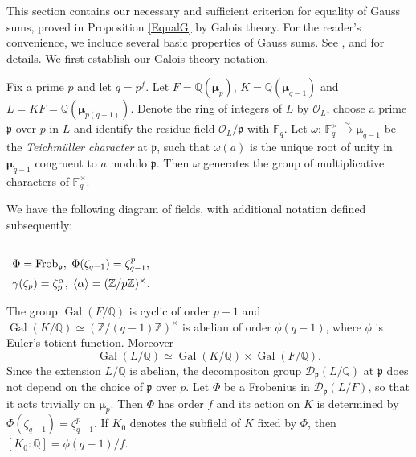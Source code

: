 \documentclass[12pt]{amsart}  \usepackage{amsmath,amssymb,enumerate,amscd,tikz,url}
\numberwithin{equation}{section}
\theoremstyle{definition}
\newcommand{\F}{{\mathbb F}}
\newcommand{\Q}{{\mathbb Q}}
\newcommand{\Z}{{\mathbb Z}}
\newcommand{\Mu}{\boldsymbol \mu}
\newcommand{\gp}{{\mathfrak p}}
\newcommand{\cD}{{\mathcal D}}
\newcommand{\cO}{{\mathcal O}}
\newcommand{\Gal}{\operatorname{Gal}}
\newcommand{\Frob}{{\rm Frob}}
\newcommand{\lr}[1]{{\langle {#1} \rangle}}
\newcommand{\fdeg}[2]{[{#1}\!:\!{#2}]}
\begin{document}
This section contains our necessary and sufficient criterion for equality of Gauss sums, proved in Proposition \ref{EqualG} by Galois theory.  For the reader's convenience, we include several basic properties of Gauss sums.   See \cite[\S6.1--6.2, 87--100]{W}, \cite[IV, \S3, 90--97]{L} and \cite[Ch.]{BEW} for details.  We first establish our Galois theory notation.

Fix a prime $p$ and let $q = p^f$.  Let $F = \Q(\Mu_p)$, $K = \Q(\Mu_{q-1})$ and $L = KF = \Q(\Mu_{p(q-1)})$.  Denote the ring of integers of $L$ by  $\cO_L$, choose a prime $\gp$ over $p$ in $L$ and identify the residue field $\cO_L/\gp$ with $\F_q$.  Let $\omega\!: \, \F_q^\times \xrightarrow{\sim} \Mu_{q-1}$ be the {\em Teichm\"uller character} at $\gp$, such that $\omega(a)$ is the unique root of unity in $\Mu_{q-1}$ congruent to $a$ modulo $\gp$.  Then $\omega$ generates the group of multiplicative characters of $\F_q^\times$.  

We have the following diagram of fields, with additional notation defined subsequently:  

\vspace{2  pt}

\begin{center}
$\begin{array}{l} 
\\
\Phi = \Frob_\gp, \hspace{3 pt} \Phi(\zeta_{q-1}) = \zeta_{q-1}^p,  \vspace{5 pt} \\ \gamma(\zeta_p) = \zeta_p^\alpha,   \hspace{3 pt} \lr{\alpha} = (\Z/p\Z)^\times.  \end{array}$
\end{center}
The group $\Gal(F/\Q)$ is cyclic of order $p-1$ and $\Gal(K/\Q) \simeq (\Z/(q-1)\Z)^\times$ is abelian of order $\phi(q-1)$, where $\phi$ is Euler's totient-function.   Moreover 
$$
\Gal(L/\Q) \simeq \Gal(K/\Q) \times \Gal(F/\Q).
$$  
Since the extension $L/\Q$ is abelian, the decompositon group $\cD_\gp(L/\Q)$ at $\gp$ does not depend on the choice of $\gp$ over $p$.  Let $\Phi$ be a Frobenius in $\cD_\gp(L/F)$, so that it acts trivially on $\Mu_p$.  Then $\Phi$ has order $f$ and its action on $K$ is determined by $\Phi(\zeta_{q-1}) = \zeta_{q-1}^p$.  If $K_0$ denotes the subfield of $K$ fixed by $\Phi$, then $\fdeg{K_0}{\Q} = \phi(q-1)/f$.  
\end{document}
